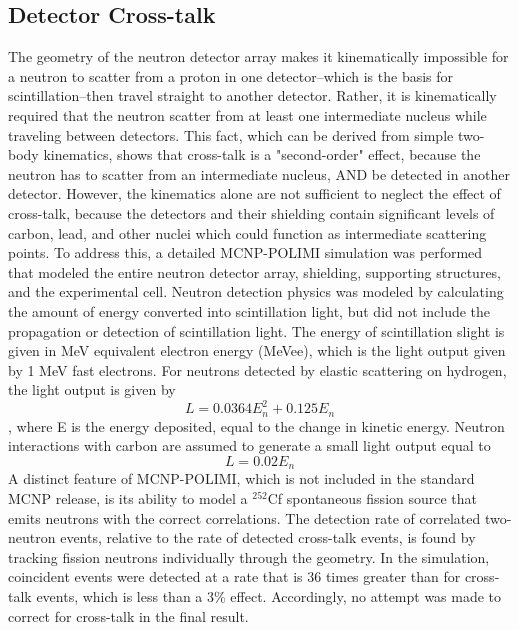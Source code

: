 \subsection{Detector Cross-talk}
The geometry of the neutron detector array makes it kinematically impossible for a neutron to scatter from a proton in one detector--which is the basis for scintillation--then travel straight to another detector.
Rather, it is kinematically required that the neutron scatter from at least one intermediate nucleus while traveling between detectors.
This fact, which can be derived from simple two-body kinematics, shows that cross-talk is a "second-order" effect, because the neutron has to scatter from an intermediate nucleus, AND be detected in another detector.
However, the kinematics alone are not sufficient to neglect the effect of cross-talk, because the detectors and their shielding contain significant levels of carbon, lead, and other nuclei which could function as intermediate scattering points.
To address this, a detailed MCNP-POLIMI simulation was performed that modeled the entire neutron detector array, shielding, supporting structures, and the experimental cell.
Neutron detection physics was modeled by calculating the amount of energy converted into scintillation light, but did not include the propagation or detection of scintillation light.
The energy of scintillation slight is given in MeV equivalent electron energy (MeVee), which is the light output given by 1 MeV fast electrons.
For neutrons detected by elastic scattering on hydrogen, the light output is given by
\begin{displaymath}
L = 0.0364 E_n^2 +  0.125 E_n
\end{displaymath}
, where E is the energy deposited, equal to the change in kinetic energy.
Neutron interactions with carbon are assumed to generate a small light output equal to
\begin{displaymath}
L = 0.02 E_n
\end{displaymath}
A distinct feature of MCNP-POLIMI, which is not included in the standard MCNP release, is its ability to model a $^{252}$Cf spontaneous fission source that emits neutrons with the correct correlations.
The detection rate of correlated two-neutron events, relative to the rate of detected cross-talk events, is found by tracking fission neutrons individually through the geometry.
In the simulation, coincident events were detected at a rate that is 36 times greater than for cross-talk events, which is less than a 3\% effect.
Accordingly, no attempt was made to correct for cross-talk in the final result.

